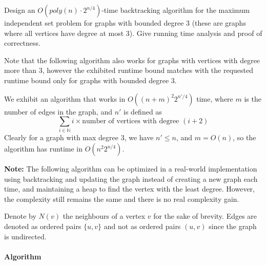 \documentclass[answers]{exam}
\begin{document}
\begin{questions}
\vspace{0.3in}




\question[20] Design an $O(poly(n) \cdot 2^{n/4})$-time backtracking algorithm for the maximum independent set problem for graphs with bounded degree $3$ (these are graphs where all vertices have degree at most $3$). Give running time analysis and proof of correctness.

\begin{solution}

    Note that the following algorithm also works for graphs with vertices with degree more than $3$, however the exhibited runtime bound matches with the requested runtime bound only for graphs with bounded degree $3$.

    We exhibit an algorithm that works in $O((n + m)^2 2^{n'/4})$ time, where $m$ is the number of edges in the graph, and $n'$ is defined as $$\sum_{i \in \mathbb{N}} i \times\text{number of vertices with degree }(i + 2)$$
    Clearly for a graph with max degree $3$, we have $n' \le n$, and $m = O(n)$, so the algorithm has runtime in $O(n^2 2^{n/4})$. 

    \textbf{Note:} The following algorithm can be optimized in a real-world implementation using backtracking and updating the graph instead of creating a new graph each time, and maintaining a heap
    to find the vertex with the least degree. However, the complexity still remains the same and there is no real complexity gain.

    Denote by $N(v)$ the neighbours of a vertex $v$ for the sake of brevity. Edges are denoted as ordered pairs $\{u, v\}$ and not as ordered pairs $(u, v)$ since the graph is undirected.

\paragraph{Algorithm}


\end{solution}
\end{questions}
\end{document}
